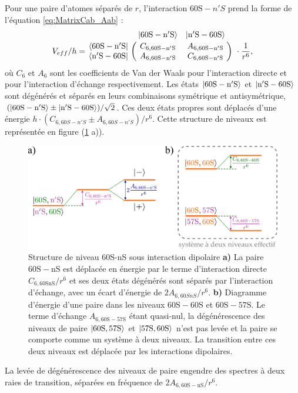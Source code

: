 Pour une paire d'atomes séparés de $r$, l'interaction $\mathrm{60S}-n'S$ prend la forme de l'équation \eqref{eq:MatrixCab_Aab} :
\begin{equation}
\label{eq:Matrix_60SnS}
V_{eff}/h = \bordermatrix{~ 	&\ket{\mathrm{60S-n'S}} 	& \ket{\mathrm{n'S-60S}} \cr
	\bra{\mathrm{60S-n'S}}		&C_{6,\mathrm{60S-n'S}}		&A_{6,\mathrm{60S-n'S}}	\cr 
	\bra{\mathrm{n'S-60S}} 		&A_{6,\mathrm{60S-n'S}}		&C_{6,\mathrm{60S-n'S}} \cr} \ \cdot \frac{1}{r^6},
\end{equation}
%
où $C_6$ et $A_6$ sont les coefficients de Van der Waals pour l'interaction directe et pour l'interaction d'échange respectivement.
Les états $\ket{\mathrm{60S-n'S}}$ et $\ket{\mathrm{n'S-60S}}$ sont dégénérés et séparés en leurs combinaisons symétrique et antisymétrique, $(\ket{\mathrm{60S-n'S}}\pm\ket{\mathrm{n'S-60S}})/\sqrt{2}$.
Ces deux états propres sont déplacés d'une énergie $h\cdot (C_{6,60S-n'S} \pm A_{6,60S-n'S}) / r^6$.
Cette structure de niveaux est représentée en figure (\ref{fig:60S-nS} a)).
%
\begin{figure}[h]
\centering
\includegraphics[width=\linewidth]{figures/low_l/60S-nS}
\caption[Structure de niveau 60S-nS sous interaction dipolaire]{
Structure de niveau 60S-nS sous interaction dipolaire
\textbf{a)} La paire $\mathrm{60S-nS}$ est déplacée en énergie par le terme d'interaction directe $C_{6,\mathrm{60SnS}}/r^6$ et ses deux états dégénérés sont séparés par l'interaction d'échange, avec un écart d'énergie de $2A_{6,60SnS}/r^6$.
\textbf{b)} Diagramme d'énergie d'une paire dans les niveaux $\mathrm{60S-60S}$ et $\mathrm{60S-57S}$.
Le terme d'échange $A_{6,\mathrm{60S-57S}}$ étant quasi-nul, la dégénérescence des niveaux de paire $\ket{\mathrm{60S,57S}}$ et $\ket{\mathrm{57S,60S}}$ n'est pas levée et la paire se comporte comme un système à deux niveaux.
La transition entre ces deux niveaux est déplacée par les interactions dipolaires.
}
\label{fig:60S-nS}
\end{figure}
%
La levée de dégénérescence des niveaux de paire engendre des spectres à deux raies de transition, séparées en fréquence de $2A_{6,\mathrm{60S-nS}}/r^6$.
